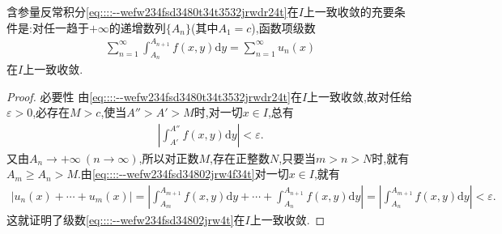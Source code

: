 \documentclass[../../main.tex]{subfiles}%
\begin{document}
\begin{theorem}\label{theorem:数学分析--定理19.9}
含参量反常积分\eqref{eq::::--wefw234fsd3480t34t3532jrwdr24t}在$I$上一致收敛的充要条件是:对任一趋于$+\infty$的递增数列$\{A_n\}$(其中$A_1 = c$),函数项级数
\begin{align}
\sum_{n=1}^{\infty} \int_{A_n}^{A_{n+1}} f(x,y)\mathrm{d}y = \sum_{n=1}^{\infty} u_n(x) \label{eq::::--wefw234fsd34802jrw4t}
\end{align}
在$I$上一致收敛.
\end{theorem}
\begin{proof}

{\heiti 必要性} 由\eqref{eq::::--wefw234fsd3480t34t3532jrwdr24t}在$I$上一致收敛,故对任给$\varepsilon > 0$,必存在$M > c$,使当$A'' > A' > M$时,对一切$x \in I$,总有
\begin{align}
\left| \int_{A'}^{A''} f(x,y)\mathrm{d}y \right| < \varepsilon. \label{eq::::--wefw234fsd34802jrw4f34t}
\end{align}
又由$A_n \to +\infty\ (n \to \infty)$,所以对正数$M$,存在正整数$N$,只要当$m > n > N$时,就有$A_m \geqslant A_n > M$.由\eqref{eq::::--wefw234fsd34802jrw4f34t}对一切$x \in I$,就有
\begin{align*}
|u_n(x) + \cdots + u_m(x)| = \left| \int_{A_m}^{A_{m+1}} f(x,y)\mathrm{d}y + \cdots + \int_{A_n}^{A_{n+1}} f(x,y)\mathrm{d}y \right| = \left| \int_{A_n}^{A_{m+1}} f(x,y)\mathrm{d}y \right| < \varepsilon.
\end{align*}
这就证明了级数\eqref{eq::::--wefw234fsd34802jrw4t}在$I$上一致收敛.


\end{proof}
\end{document}
